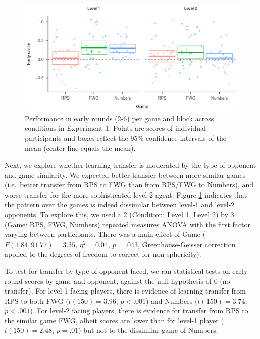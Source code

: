\documentclass[man,floatsintext]{apa6}
\begin{document}
\begin{figure}

{\centering \includegraphics{paper_draft_2021_files/figure-latex/exp1-early-score-by-opp-1} 

}

\caption{\label{ref:figure4-caption}Performance in early rounds (2-6) per game and block across conditions in Experiment 1. Points are scores of individual participants and boxes reflect the 95\% confidence intervals of the mean (center line equals the mean).}\label{fig:exp1-early-score-by-opp}
\end{figure}

Next, we explore whether learning transfer is moderated by the type of opponent and game similarity. We expected better transfer between more similar games (i.e.~better transfer from RPS to FWG than from RPS/FWG to Numbers), and worse transfer for the more sophisticated level-2 agent. Figure \ref{fig:exp1-early-score-by-opp} indicates that the pattern over the games is indeed dissimilar between level-1 and level-2 opponents. To explore this, we used a 2 (Condition: Level 1, Level 2) by 3 (Game: RPS, FWG, Numbers) repeated measures ANOVA with the first factor varying between participants. There was a main effect of Game (\(F(1.84,91.77) = 3.35\), \(\eta^{2} = 0.04\), \(p = .043\), Greenhouse-Geisser correction applied to the degrees of freedom to correct for non-sphericity).

To test for transfer by type of opponent faced, we ran statistical tests on early round scores by game and opponent, against the null hypothesis of 0 (no transfer). For level-1 facing players, there is evidence of learning transfer from RPS to both FWG (\(t(150) = 3.96\), \(p < .001\)) and Numbers (\(t(150) = 3.74\), \(p < .001\)). For level-2 facing players, there is evidence for transfer from RPS to the similar game FWG, albeit scores are lower than for level-1 player (\(t(150) = 2.48\), \(p = .01\)) but not to the dissimilar game of Numbers.
\end{document}

